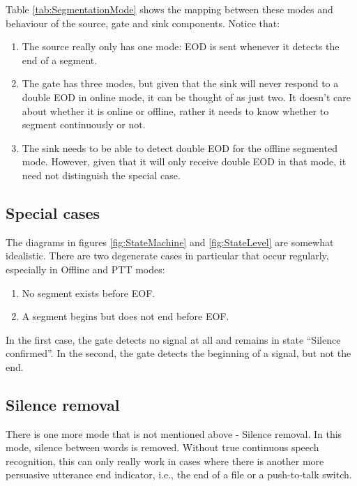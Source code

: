 Table \ref{tab:SegmentationMode} shows the mapping between these modes
and behaviour of the source, gate and sink components.  Notice that:
\begin{enumerate}
\item The source really only has one mode: EOD is sent whenever it
  detects the end of a segment.
\item The gate has three modes, but given that the sink will never
  respond to a double EOD in online mode, it can be thought of as just
  two.  It doesn't care about whether it is online or offline, rather
  it needs to know whether to segment continuously or not.
\item The sink needs to be able to detect double EOD for the offline
  segmented mode.  However, given that it will only receive double EOD
  in that mode, it need not distinguish the special case.
\end{enumerate}


\subsection{Special cases}

The diagrams in figures \ref{fig:StateMachine} and
\ref{fig:StateLevel} are somewhat idealistic.  There are two
degenerate cases in particular that occur regularly, especially in
Offline and PTT modes:
\begin{enumerate}
\item No segment exists before EOF.
\item A segment begins but does not end before EOF.
\end{enumerate}
In the first case, the gate detects no signal at all and remains in
state ``Silence confirmed''.  In the second, the gate detects the
beginning of a signal, but not the end.


\subsection{Silence removal}

There is one more mode that is not mentioned above - Silence removal.
In this mode, silence between words is removed.  Without true
continuous speech recognition, this can only really work in cases
where there is another more persuasive utterance end indicator, i.e.,
the end of a file or a push-to-talk switch.




